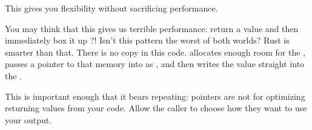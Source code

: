This gives you flexibility without sacrificing performance.

\blank

You may think that this gives us terrible performance: return a value and then immediately box it up ?! Isn't this pattern the 
worst of both worlds? Rust is smarter than that. There is no copy in this code.  allocates enough room for the , 
passes a pointer to that memory into  as \x, and then  writes the value straight into the .

\blank

This is important enough that it bears repeating: pointers are not for optimizing returning values from your code. Allow the caller 
to choose how they want to use your output.
